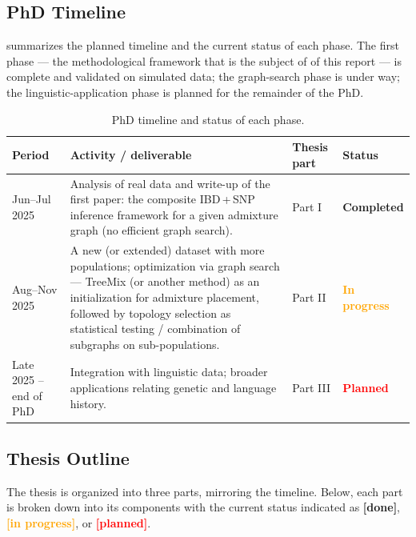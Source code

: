 \documentclass[12pt]{article}
\theoremstyle{definition}
\theoremstyle{definition}
\theoremstyle{lemma}
\theoremstyle{remark}
\theoremstyle{definition}
\begin{document}
\subsection{PhD Timeline}
 summarizes the planned timeline and the current status of each
phase. The first phase --- the methodological framework that is the subject of
 of this report --- is complete and validated on
simulated data; the graph-search phase is under way; the linguistic-application
phase is planned for the remainder of the PhD.

\begin{table}[!htbp]
\centering
\renewcommand{\arraystretch}{1.3}
\begin{tabular}{p{3.0cm} p{8.5cm} p{1.6cm} l}
\toprule
\textbf{Period} & \textbf{Activity / deliverable} & \textbf{Thesis part} & \textbf{Status} \\
\midrule
Jun--Jul 2025 &
Analysis of real data and write-up of the first paper: the composite IBD\,+\,SNP
inference framework for a given admixture graph (no efficient graph search). &
Part I &
\textcolor{codegreen}{\textbf{Completed}} \\
Aug--Nov 2025 &
A new (or extended) dataset with more populations; optimization via graph search
--- TreeMix (or another method) as an initialization for admixture placement,
followed by topology selection as statistical testing / combination of subgraphs
on sub-populations. &
Part II &
\textcolor{orange}{\textbf{In progress}} \\
Late 2025 -- end of PhD &
Integration with linguistic data; broader applications relating genetic and
language history. &
Part III &
\textcolor{red}{\textbf{Planned}} \\
\bottomrule
\end{tabular}
\caption{PhD timeline and status of each phase.}\label{tab:timeline}
\end{table}

\subsection{Thesis Outline}
The thesis is organized into three parts, mirroring the timeline. Below, each
part is broken down into its components with the current status indicated as
\textcolor{codegreen}{\textbf{[done]}},
\textcolor{orange}{\textbf{[in progress]}}, or
\textcolor{red}{\textbf{[planned]}}.
\end{document}

